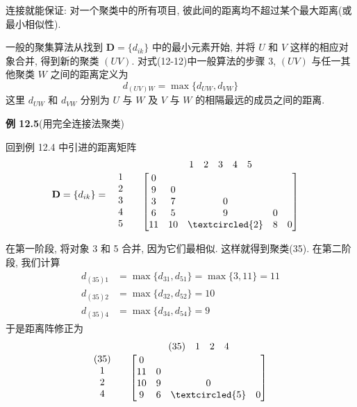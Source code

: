 
连接就能保证: 对一个聚类中的所有项目, 彼此间的距离均不超过某个最大距离(或最小相似性).

一般的聚集算法从找到 $\mathbf{D}=\{d_{ik}\}$ 中的最小元素开始, 并将 $U$ 和 $V$ 这样的相应对象合并, 得到新的聚类 $(UV)$. 对式(12-12)中一般算法的步骤 3, $(UV)$ 与任一其他聚类 $W$ 之间的距离定义为
\label{eq:12-14}
\begin{equation}
d_{(UV)W}=\max\{d_{UW},d_{VW}\}
\tag{12-14}
\end{equation}
这里 $d_{UW}$ 和 $d_{VW}$ 分别为 $U$ 与 $W$ 及 $V$ 与 $W$ 的相隔最远的成员之间的距离.

\noindent\textbf{例 12.5}\quad (用完全连接法聚类)

回到例 12.4 中引进的距离矩阵
\[
\mathbf{D}=\{d_{ik}\}=
\begin{array}{cc}
\begin{array}{c}\mbox{}\\1\\2\\3\\4\\5\end{array} &
\begin{array}{c}
\begin{array}{ccccc}1&2&3&4&5\end{array}\\[2pt]
\begin{bmatrix}
0& & & & \\
9&0& & & \\
3&7&0& & \\
6&5&9&0& \\
11&10&\textcircled{2}&8&0
\end{bmatrix}
\end{array}
\end{array}
\]

在第一阶段, 将对象 3 和 5 合并, 因为它们最相似. 这样就得到聚类(35). 在第二阶段, 我们计算
\[
\begin{aligned}
d_{(35)1}&=\max\{d_{31},d_{51}\}=\max\{3,11\}=11\\
d_{(35)2}&=\max\{d_{32},d_{52}\}=10\\
d_{(35)4}&=\max\{d_{34},d_{54}\}=9
\end{aligned}
\]
于是距离阵修正为
\[
\begin{array}{cc}
\begin{array}{c}\mbox{}\\(35)\\1\\2\\4\end{array} &
\begin{array}{c}
\begin{array}{cccc}(35)&1&2&4\end{array}\\[2pt]
\begin{bmatrix}
0& & & \\
11&0& & \\
10&9&0& \\
9&6&\textcircled{5}&0
\end{bmatrix}
\end{array}
\end{array}
\]

